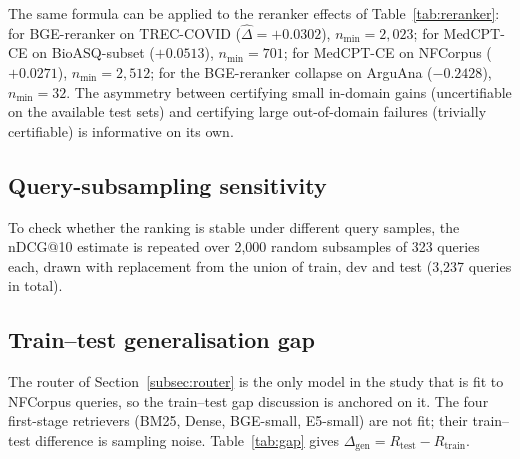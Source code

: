 \documentclass[11pt,a4paper]{article}
\begin{document}
The same formula can be applied to the reranker effects of
Table~\ref{tab:reranker}: for BGE-reranker on TREC-COVID
($\hat\Delta = +0.0302$), $n_{\min} = 2{,}023$; for MedCPT-CE on
BioASQ-subset ($+0.0513$), $n_{\min} = 701$; for MedCPT-CE on NFCorpus
($+0.0271$), $n_{\min} = 2{,}512$; for the BGE-reranker collapse on
ArguAna ($-0.2428$), $n_{\min} = 32$. The asymmetry between certifying
small in-domain gains (uncertifiable on the available test sets) and
certifying large out-of-domain failures (trivially certifiable) is
informative on its own.

\subsection{Query-subsampling sensitivity}

To check whether the ranking is stable under different query samples,
the nDCG@10 estimate is repeated over 2{,}000 random subsamples of 323
queries each, drawn with replacement from the union of train, dev and
test (3{,}237 queries in total).

\begin{table}[ht]
    \centering
    \caption{Subsampling sensitivity across 2{,}000 bootstrap trials.
    Dense $-$ BM25 has a lower 2.5th percentile strictly above zero,
    so Dense wins in at least 97.5\% of resamples.}
    \label{tab:subsampling}
    \small
    
\end{table}

\subsection{Train--test generalisation gap}
\label{subsec:gap}

The router of Section~\ref{subsec:router} is the only model in the
study that is fit to NFCorpus queries, so the train--test gap
discussion is anchored on it. The four first-stage retrievers (BM25,
Dense, BGE-small, E5-small) are not fit; their train--test difference
is sampling noise. Table~\ref{tab:gap} gives
$\Delta_{\text{gen}} = R_{\text{test}} - R_{\text{train}}$.

\begin{table}[ht]
    \centering
    \caption{Train--test generalisation gap on NFCorpus. The four
    first-stage retrievers are not fit to NFCorpus queries, so their
    gap is the variance baseline; the routers are fit. The
    Mann--Whitney $p$-value tests whether per-query loss distributions
    differ between the train split (2{,}590 queries) and the test split
    (323 queries).}
    \label{tab:gap}
    \small
    
\end{table}
\end{document}
